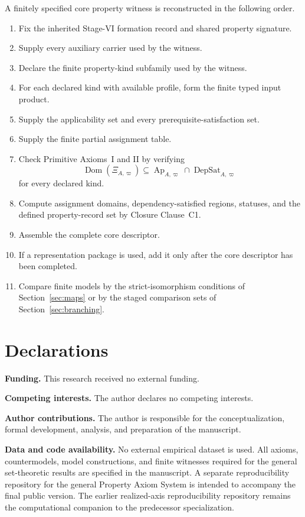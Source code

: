 \documentclass[11pt]{article}
\newcommand{\Ap}{\operatorname{Ap}}
\newcommand{\DepSat}{\operatorname{DepSat}}
\newcommand{\Dom}{\operatorname{Dom}}
\theoremstyle{definition}
\theoremstyle{remark}
\begin{document}
A finitely specified core property witness is reconstructed in the following order.
\begin{enumerate}
\item Fix the inherited Stage-VI formation record and shared property signature.
\item Supply every auxiliary carrier used by the witness.
\item Declare the finite property-kind subfamily used by the witness.
\item For each declared kind with available profile, form the finite typed input product.
\item Supply the applicability set and every prerequisite-satisfaction set.
\item Supply the finite partial assignment table.
\item Check Primitive Axioms~I and II by verifying
\[
\Dom(\Xi_{A,\varpi})
\subseteq
\Ap_{A,\varpi}\cap\DepSat_{A,\varpi}
\]
for every declared kind.
\item Compute assignment domains, dependency-satisfied regions, statuses, and the defined property-record set by Closure Clause~C1.
\item Assemble the complete core descriptor.
\item If a representation package is used, add it only after the core descriptor has been completed.
\item Compare finite models by the strict-isomorphism conditions of Section~\ref{sec:maps} or by the staged comparison sets of Section~\ref{sec:branching}.
\end{enumerate}

\section*{Declarations}

\noindent\textbf{Funding.} This research received no external funding.

\noindent\textbf{Competing interests.} The author declares no competing interests.

\noindent\textbf{Author contributions.} The author is responsible for the conceptualization, formal development, analysis, and preparation of the manuscript.

\noindent\textbf{Data and code availability.} No external empirical dataset is used.
All axioms, countermodels, model constructions, and finite witnesses required for the general set-theoretic results are specified in the manuscript.
A separate reproducibility repository for the general Property Axiom System is intended to accompany the final public version.
The earlier realized-axis reproducibility repository remains the computational companion to the predecessor specialization.
\end{document}
